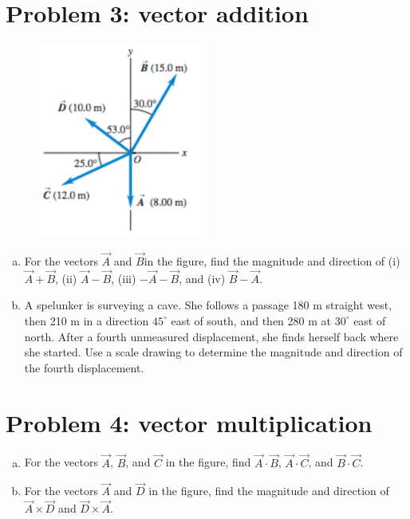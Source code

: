 \documentclass[10pt,letter]{article}
\begin{document}
\section*{Problem 3: vector addition}
\begin{figure}[!ht]
  \centering
    \includegraphics[width=0.5\textwidth]{fig1.png}
\end{figure}
\begin{enumerate}[(a)]
\item For the vectors $\vec{A}$ and $\vec{B} $in the figure, find the magnitude and direction of (i) $\vec{A} + \vec{B}$, (ii) $\vec{A} - \vec{B}$, (iii) $-\vec{A} - \vec{B}$, and (iv) $\vec{B} - \vec{A}$.
\item A spelunker is surveying a cave. She follows a passage 180 m straight west, then 210 m in a direction $45^\circ$ east of south, and then 280 m at $30^\circ$ east of north. After a fourth unmeasured displacement, she finds herself back where she started. Use a scale drawing to determine the magnitude and direction of the fourth displacement. 
\end{enumerate}
\section*{Problem 4: vector multiplication}
\begin{enumerate}[(a)]
\item For the vectors $\vec{A}$, $\vec{B}$, and $\vec{C}$ in the figure, find $\vec{A}\cdot\vec{B}$, $\vec{A}\cdot\vec{C}$, and $\vec{B}\cdot\vec{C}$.
\item For the vectors $\vec{A}$ and $\vec{D}$ in the figure, find the magnitude and direction of $\vec{A} \times \vec{D}$ and $\vec{D} \times \vec{A}$.
\end{enumerate}
\end{document}
